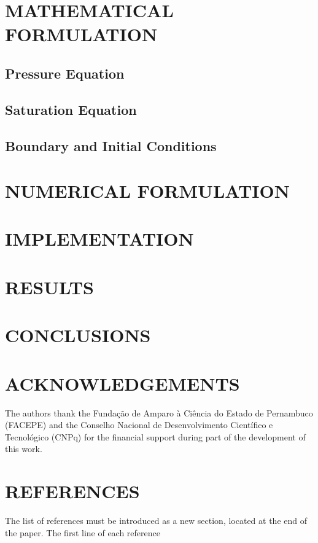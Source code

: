 \documentclass[10pt,fleqn,a4paper]{article}
\begin{document}
\section{MATHEMATICAL FORMULATION}


\subsection{Pressure Equation}


\subsection{Saturation Equation}


\subsection{Boundary and Initial Conditions}

\section{NUMERICAL FORMULATION}

\section{IMPLEMENTATION}

\section{RESULTS}

\section{CONCLUSIONS}

\section{ACKNOWLEDGEMENTS}

The authors thank the Funda\c{c}\~ao de Amparo \`a Ci\^encia do Estado de Pernambuco (FACEPE) and the Conselho Nacional de Desenvolvimento Cient\'ifico e Tecnol\'ogico (CNPq) for the financial support during part of the development of this work.

\section{REFERENCES}

The list of references must be introduced as a new section, located at the end of the paper. The first line of each reference 



\end{document}
